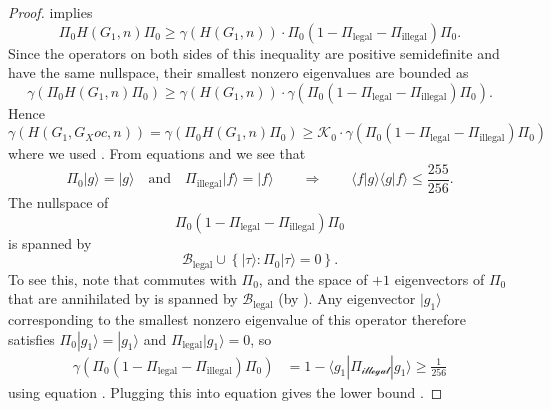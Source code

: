 \documentclass[../thesis-main/thesis-main]{subfiles}
\begin{document}
\begin{proof}
implies 
\begin{equation}
\Pi_{0}H(G_{1},n)\Pi_{0}\geq\gamma(H(G_{1},n))\cdot\Pi_{0}(1-\Pi_{\text{legal}}-\Pi_{\text{illegal}})\Pi_{0}.
\end{equation}
Since the operators on both sides of this inequality are positive semidefinite and have the same nullspace, their smallest nonzero eigenvalues are bounded as 
\begin{equation}
\gamma(\Pi_{0}H(G_{1},n)\Pi_{0})\geq\gamma(H(G_{1},n))\cdot\gamma(\Pi_{0}(1-\Pi_{\text{legal}}-\Pi_{\text{illegal}})\Pi_{0}).
\end{equation}
Hence 
\begin{equation}
\gamma(H(G_{1},G_Xoc,n))=\gamma(\Pi_{0}H(G_{1},n)\Pi_{0}) \geq \mathcal{K}_0\cdot\gamma(\Pi_{0}(1-\Pi_{\text{legal}}-\Pi_{\text{illegal}})\Pi_{0})
\label{eq:gamma_bnd1}
\end{equation}
where we used . From equations  and  we see that 
\begin{equation}
\Pi_{0}|g\rangle=|g\rangle\quad\text{and}\quad\Pi_{\text{illegal}}|f\rangle=|f\rangle\qquad\Longrightarrow\qquad\langle f|g\rangle\langle g|f\rangle\leq\frac{255}{256}.\label{eq:fg_eqn}
\end{equation}
The nullspace of 
\begin{equation}
\Pi_{0}\left(1-\Pi_{\text{legal}}-\Pi_{\text{illegal}}\right)\Pi_{0}\label{eq:projector_conjugated}
\end{equation}
is spanned by 
\begin{equation}
\mathcal{B}_{\text{legal}}\cup\left\{ |\tau\rangle\colon\Pi_{0}|\tau\rangle=0\right\} .
\end{equation}
To see this, note that  commutes with $\Pi_{0}$, and the space of $+1$ eigenvectors of $\Pi_{0}$ that are annihilated by  is spanned by $\mathcal{B}_{\text{legal}}$ (by ). Any eigenvector $|g_{1}\rangle$ corresponding to the smallest nonzero eigenvalue of this operator therefore satisfies $\Pi_{0}|g_{1}\rangle=|g_{1}\rangle$ and $\Pi_{\text{legal}}|g_{1}\rangle=0$, so 
\begin{align}
\gamma(\Pi_{0}(1-\Pi_{\text{legal}}-\Pi_{\text{illegal}})\Pi_{0}) 
&= 1-\langle g_{1}|\Pi_{\mathcal{\text{illegal}}}|g_{1}\rangle\geq\frac{1}{256}
\end{align}
using equation . Plugging this into equation  gives the lower bound . 
\end{proof}
\end{document}
